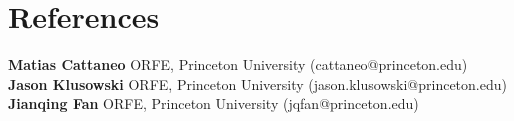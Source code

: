 \documentclass[10pt,a4paper,roman]{moderncv}        %
\begin{document}
\section{References}
\textbf{Matias Cattaneo} ORFE, Princeton University (cattaneo@princeton.edu)\\
\textbf{Jason Klusowski} ORFE, Princeton University (jason.klusowski@princeton.edu)\\
\textbf{Jianqing Fan} ORFE, Princeton University (jqfan@princeton.edu)


\clearpage
\end{document}
